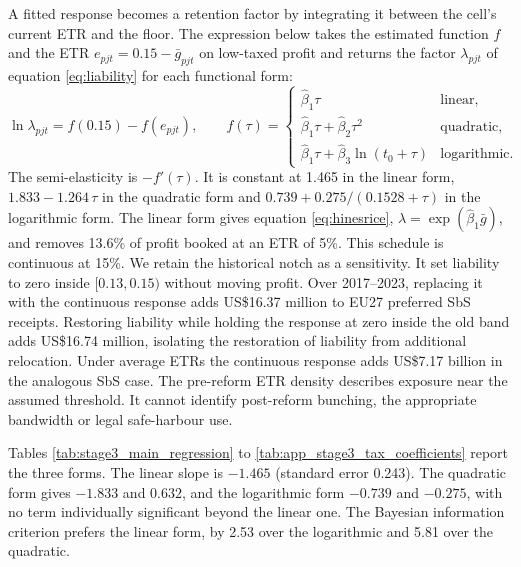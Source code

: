 \documentclass[11pt,a4paper]{article}
\newcommand{\usd}{US\$}
\begin{document}



A fitted response becomes a retention factor by integrating it between the cell's current ETR and the floor. The expression below takes the estimated function $f$ and the ETR $e_{pjt}=0.15-\bar g_{pjt}$ on low-taxed profit and returns the factor $\lambda_{pjt}$ of equation \eqref{eq:liability} for each functional form:
\begin{equation}\label{eq:app_integral}
\ln\lambda_{pjt}=f(0.15)-f(e_{pjt}),\qquad
f(\tau)=\begin{cases}
\hat\beta_1\tau & \text{linear},\\
\hat\beta_1\tau+\hat\beta_2\tau^{2} & \text{quadratic},\\
\hat\beta_1\tau+\hat\beta_3\ln(t_0+\tau) & \text{logarithmic}.
\end{cases}
\end{equation}
The semi-elasticity is $-f'(\tau)$. It is constant at 1.465 in the linear form, $1.833-1.264\,\tau$ in the quadratic form and $0.739+0.275/(0.1528+\tau)$ in the logarithmic form. The linear form gives equation \eqref{eq:hinesrice}, $\lambda=\exp(\hat\beta_1\bar g)$, and removes 13.6\% of profit booked at an ETR of 5\%. This schedule is continuous at 15\%. We retain the historical notch as a sensitivity. It set liability to zero inside $[0.13,0.15)$ without moving profit. Over 2017–2023, replacing it with the continuous response adds \usd16.37 million to EU27 preferred SbS receipts. Restoring liability while holding the response at zero inside the old band adds \usd16.74 million, isolating the restoration of liability from additional relocation. Under average ETRs the continuous response adds \usd7.17 billion in the analogous SbS case. The pre-reform ETR density describes exposure near the assumed threshold. It cannot identify post-reform bunching, the appropriate bandwidth or legal safe-harbour use.





Tables \ref{tab:stage3_main_regression} to \ref{tab:app_stage3_tax_coefficients} report the three forms. The linear slope is $-1.465$ (standard error 0.243). The quadratic form gives $-1.833$ and $0.632$, and the logarithmic form $-0.739$ and $-0.275$, with no term individually significant beyond the linear one. The Bayesian information criterion prefers the linear form, by 2.53 over the logarithmic and 5.81 over the quadratic.
\end{document}
